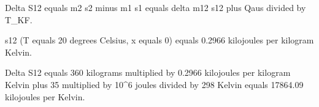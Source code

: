 Delta S12 equals m2 s2 minus m1 s1 equals delta m12 s12 plus Qaus divided by T_KF.  

s12 (T equals 20 degrees Celsius, x equals 0) equals 0.2966 kilojoules per kilogram Kelvin.  

Delta S12 equals 360 kilograms multiplied by 0.2966 kilojoules per kilogram Kelvin plus 35 multiplied by 10^6 joules divided by 298 Kelvin equals 17864.09 kilojoules per Kelvin.